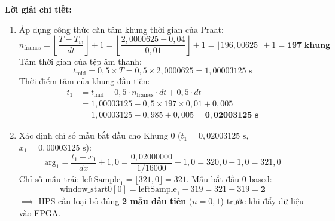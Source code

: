 \textbf{Lời giải chi tiết:}
\begin{enumerate}[label=(\alph*)]
    \item Áp dụng công thức căn tâm khung thời gian của Praat:
    \begin{equation}
    n_{\text{frames}} = \left\lfloor \frac{T - T_w}{dt} \right\rfloor + 1 = \left\lfloor \frac{2{,}0000625 - 0{,}04}{0{,}01} \right\rfloor + 1 = \lfloor 196{,}00625 \rfloor + 1 = \mathbf{197\text{ khung}}
    \end{equation}
    Tâm thời gian của tệp âm thanh:
    \begin{equation}
    t_{\text{mid}} = 0{,}5 \times T = 0{,}5 \times 2{,}0000625 = 1{,}00003125\text{ s}
    \end{equation}
    Thời điểm tâm của khung đầu tiên:
    \begin{align}
    t_1 &= t_{\text{mid}} - 0{,}5 \cdot n_{\text{frames}} \cdot dt + 0{,}5 \cdot dt \nonumber \\
        &= 1{,}00003125 - 0{,}5 \times 197 \times 0{,}01 + 0{,}005 \nonumber \\
        &= 1{,}00003125 - 0{,}985 + 0{,}005 = \mathbf{0{,}02003125\text{ s}}
    \end{align}
    
    \item Xác định chỉ số mẫu bắt đầu cho Khung 0 ($t_1 = 0{,}02003125\text{ s}$, $x_1 = 0{,}00003125\text{ s}$):
    \begin{equation}
    \text{arg}_1 = \frac{t_1 - x_1}{dx} + 1{,}0 = \frac{0{,}02000000}{1/16000} + 1{,}0 = 320{,}0 + 1{,}0 = 321{,}0
    \end{equation}
    Chỉ số mẫu trái: $\text{leftSample}_1 = \lfloor 321{,}0 \rfloor = 321$.
    Mẫu bắt đầu 0-based:
    \begin{equation}
    \text{window\_start0}[0] = \text{leftSample}_1 - 319 = 321 - 319 = \mathbf{2}
    \end{equation}
    $\implies$ HPS cần loại bỏ đúng \textbf{2 mẫu đầu tiên} ($n = 0, 1$) trước khi đẩy dữ liệu vào FPGA.
    

\end{enumerate}
